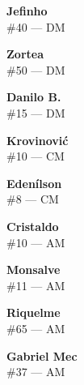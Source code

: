 \documentclass[11pt]{article}
\begin{document}
\begin{minipage}[t]{0.30\textwidth}
\centering
\textbf{Jefinho}\\
\#40 --- DM\\
\vspace{0.2cm}
\end{minipage}
\hfill
\begin{minipage}[t]{0.30\textwidth}
\centering
\textbf{Zortea}\\
\#50 --- DM\\
\vspace{0.2cm}
\end{minipage}
\hfill
\begin{minipage}[t]{0.30\textwidth}
\centering
\textbf{Danilo B.}\\
\#15 --- DM\\
\vspace{0.2cm}
\end{minipage}
\vspace{0.5cm}

\begin{minipage}[t]{0.30\textwidth}
\centering
\textbf{Krovinović}\\
\#10 --- CM\\
\vspace{0.2cm}
\end{minipage}
\hfill
\begin{minipage}[t]{0.30\textwidth}
\centering
\textbf{Edenílson}\\
\#8 --- CM\\
\vspace{0.2cm}
\end{minipage}
\hfill
\begin{minipage}[t]{0.30\textwidth}
\centering
\textbf{Cristaldo}\\
\#10 --- AM\\
\vspace{0.2cm}
\end{minipage}
\vspace{0.5cm}

\begin{minipage}[t]{0.30\textwidth}
\centering
\textbf{Monsalve}\\
\#11 --- AM\\
\vspace{0.2cm}
\end{minipage}
\hfill
\begin{minipage}[t]{0.30\textwidth}
\centering
\textbf{Riquelme}\\
\#65 --- AM\\
\vspace{0.2cm}
\end{minipage}
\hfill
\begin{minipage}[t]{0.30\textwidth}
\centering
\textbf{Gabriel Mec}\\
\#37 --- AM\\
\vspace{0.2cm}
\end{minipage}
\vspace{0.5cm}
\end{document}
